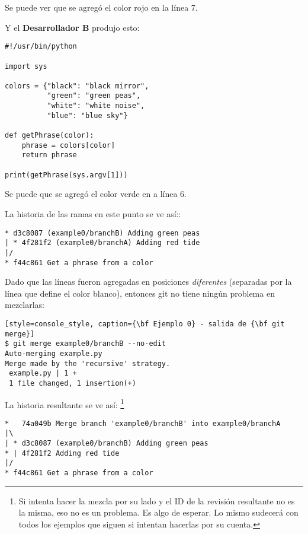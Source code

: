 Se puede ver que se agregó el color rojo en la línea 7.

Y el {\bf Desarrollador B} produjo esto:
\begin{lstlisting}[style=python_style, caption={\bf Ejemplo 0} - Desarrollador B]
#!/usr/bin/python

import sys

colors = {"black": "black mirror",
          "green": "green peas",
          "white": "white noise",
          "blue": "blue sky"}

def getPhrase(color):
    phrase = colors[color]
    return phrase

print(getPhrase(sys.argv[1]))
\end{lstlisting}

Se puede que se agregó el color verde en a línea 6.

La historia de las ramas en este punto se ve así::
\begin{lstlisting}[style=branch_history_style, caption={\bf Example 0} - branch history]
* d3c8087 (example0/branchB) Adding green peas
| * 4f281f2 (example0/branchA) Adding red tide
|/  
* f44c861 Get a phrase from a color
\end{lstlisting}

Dado que las líneas fueron agregadas en posiciones {\it diferentes} (separadas por la línea que define el color blanco), entonces
git no tiene ningún problema en mezclarlas:

\begin{lstlisting}[style=console_style, caption={\bf Ejemplo 0} - salida de {\bf git merge}]
$ git merge example0/branchB --no-edit
Auto-merging example.py
Merge made by the 'recursive' strategy.
 example.py | 1 +
 1 file changed, 1 insertion(+)
\end{lstlisting}

La historia resultante se ve así: \footnote{Si intenta hacer la mezcla por su lado y el ID de la revisión resultante no es la misma,
eso no es un problema. Es algo de esperar. Lo mismo sudecerá con todos los ejemplos que siguen si intentan hacerlas por su cuenta.}

\begin{lstlisting}[style=branch_history_style, caption={\bf Ejemplo 0} - historia final de las ramas]
*   74a049b Merge branch 'example0/branchB' into example0/branchA
|\  
| * d3c8087 (example0/branchB) Adding green peas
* | 4f281f2 Adding red tide
|/  
* f44c861 Get a phrase from a color
\end{lstlisting}

